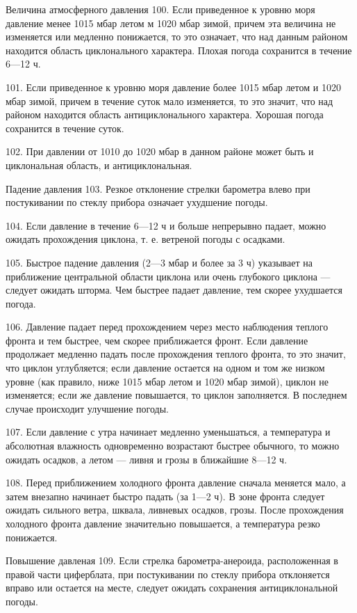 Величина атмосферного давления
100. Если приведенное к уровню моря давление менее 1015 мбар летом м 1020 мбар зимой, причем эта величина не изменяется или медленно понижается, то это означает, что над данным районом находится область циклонального характера. Плохая погода сохранится в течение 6—12 ч.

101. Если приведенное к уровню моря давление более 1015 мбар летом и 1020 мбар зимой, причем в течение суток мало изменяется, то это значит, что над районом находится область антициклонального характера. Хорошая погода сохранится в течение суток.

102. При давлении от 1010 до 1020 мбар в данном районе может быть и циклональная область, и антициклональная.

Падение давления
103. Резкое отклонение стрелки барометра влево при постукивании по стеклу прибора означает ухудшение погоды.

104. Если давление в течение 6—12 ч и больше непрерывно падает, можно ожидать прохождения циклона, т. е. ветреной погоды с осадками.

105. Быстрое падение давления (2—3 мбар и более за 3 ч) указывает на приближение центральной области циклона или очень глубокого циклона — следует ожидать шторма. Чем быстрее падает давление, тем скорее ухудшается погода.

106. Давление падает перед прохождением через место наблюдения теплого фронта и тем быстрее, чем скорее приближается фронт. Если давление продолжает медленно падать после прохождения теплого фронта, то это значит, что циклон углубляется; если давление остается на одном и том же низком уровне (как правило, ниже 1015 мбар летом и 1020 мбар зимой), циклон не изменяется; если же давление повышается, то циклон заполняется. В последнем случае происходит улучшение погоды.

107. Если давление с утра начинает медленно уменьшаться, а температура и абсолютная влажность одновременно возрастают быстрее обычного, то можно ожидать осадков, а летом — ливня и грозы в ближайшие 8—12 ч.

108. Перед приближением холодного фронта давление сначала меняется мало, а затем внезапно начинает быстро падать (за 1—2 ч). В зоне фронта следует ожидать сильного ветра, шквала, ливневых осадков, грозы. После прохождения холодного фронта давление значительно повышается, а температура резко понижается.

Повышение давленая
109. Если стрелка барометра-анероида, расположенная в правой части циферблата, при постукивании по стеклу прибора отклоняется вправо или остается на месте, следует ожидать сохранения антициклональной погоды.

